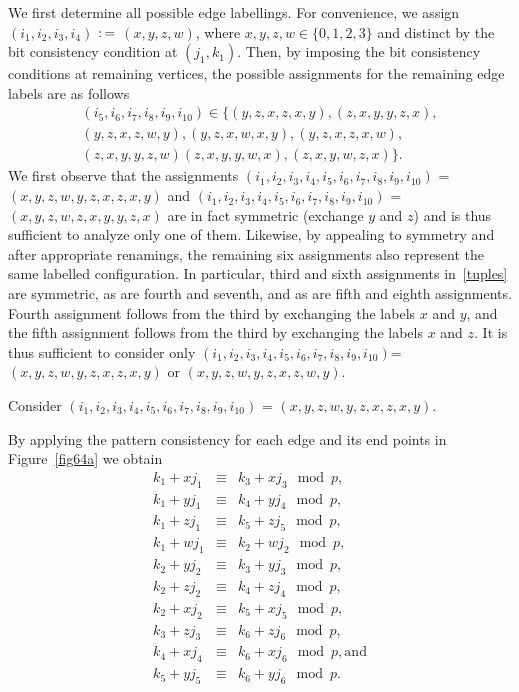 We first determine all possible edge labellings. For convenience, we
assign $(i_1,i_2,i_3,i_4)$ $\asn$ $(x,y,z,w)$, where $x,y,z,w \in
\{0,1,2,3 \}$ and distinct by the bit consistency condition at
$(j_1,k_1)$. Then, by imposing the bit consistency conditions at
remaining vertices, the possible assignments for the remaining edge
labels are as follows
\begin{equation}\label{tuples}\begin{array}{cccccc} (i_5,i_6,i_7,i_8,i_9,i_{10}) \in
 \{(y,z,x,z,x,y), (z,x,y,y,z,x),  \\
 (y,z,x,z,w,y),
(y,z,x,w,x,y),  (y,z,x,z,x,w),\\(z,x,y,y,z,w)
(z,x,y,y,w,x),(z,x,y,w,z,x) \}. \end{array}\end{equation}
We first
observe that the assignments
$(i_1,i_2,i_3,i_4,i_5,i_6,i_7,i_8,i_9,i_{10})$
 = $(x,y,z,w,y,z,x,z,x,y)$ and
$(i_1,i_2,i_3,i_4,i_5,i_6,i_7,i_8,i_9,i_{10})$
=$(x,y,z,w,z,x,y,y,z,x)$ are in fact symmetric (exchange $y$ and
$z$) and is thus sufficient to analyze only one of them. Likewise,
by appealing to symmetry and after appropriate renamings, the
remaining six assignments also represent the same labelled
configuration. In particular, third and sixth assignments
in~\eqref{tuples} are symmetric,  as are fourth and seventh, and as
are fifth and eighth assignments. Fourth assignment follows from the
third by exchanging the labels $x$ and $y$, and the fifth assignment
follows from the third by exchanging the labels $x$ and $z$. It is
thus sufficient to consider only
$(i_1,i_2,i_3,i_4,i_5,i_6,i_7,i_8,i_9,i_{10})$=
$(x,y,z,w,y,z,x,z,x,y)$ or $(x,y,z,w,y,z,x,z,w,y)$.

Consider $(i_1,i_2,i_3,i_4,i_5,i_6,i_7,i_8,i_9,i_{10})$ =
$(x,y,z,w,y,z,x,z,x,y)$.

By applying the pattern consistency for each edge and its end points
in Figure~\ref{fig64a} we obtain
\begin{equation}\label{con64a}\begin{array}{cccc}
k_1+xj_1 &\equiv& k_3+xj_3 \mod p, \\
k_1+yj_1 &\equiv& k_4+yj_4 \mod p,\\
k_1+zj_1 &\equiv& k_5+zj_5 \mod p, \\
k_1+wj_1 &\equiv& k_2+wj_2 \mod p, \\
k_2+yj_2 &\equiv& k_3+yj_3 \mod p, \\
k_2+zj_2 &\equiv& k_4+zj_4 \mod p, \\
k_2+xj_2 &\equiv& k_5+xj_5 \mod p, \\
k_3+zj_3 &\equiv& k_6+zj_6 \mod p, \\
k_4+xj_4 &\equiv& k_6+xj_6 \mod p,\text{and} \\
k_5+yj_5 &\equiv& k_6+yj_6 \mod p.
\end{array}\end{equation}

